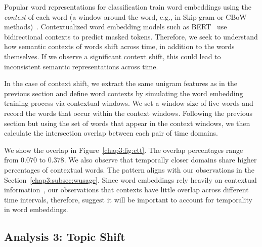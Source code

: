 Popular word representations for classification train word embeddings using the \textit{context} of each word (a window around the word, e.g., in Skip-gram or CBoW methods)~\cite{mikolov2013distributed, bojanowski2017enriching}.
Contextualized word embedding models such as BERT~\cite{devlin2019bert} use bidirectional contexts to predict masked tokens.
Therefore, we seek to understand how semantic contexts of words shift across time, in addition to the words themselves. 
If we observe a significant context shift, this could lead to inconsistent semantic representations across time.

In the case of context shift, we extract the same unigram features as in the previous section and define word contexts by simulating the word embedding training process via contextual windows. We set a window size of five words and record the words that occur within the context windows. Following the previous section but using the set of words that appear in the context windows, we then calculate the intersection overlap between each pair of time domains.  

We show the overlap in Figure~\ref{chap3:fig:ctt}.
The overlap percentages range from 0.070 to 0.378. We also observe that temporally closer domains share higher percentages of contextual words. The pattern aligns with our observations in the Section~\ref{chap3:subsec:wusage}. 
Since word embeddings rely heavily on contextual information~\cite{mikolov2013distributed, devlin2019bert}, our observations that contexts have little overlap across different time intervals, therefore, suggest it will be important to account for temporality in word embeddings.


\subsection{Analysis 3: Topic Shift}
\label{chap3:subsec:topic}

